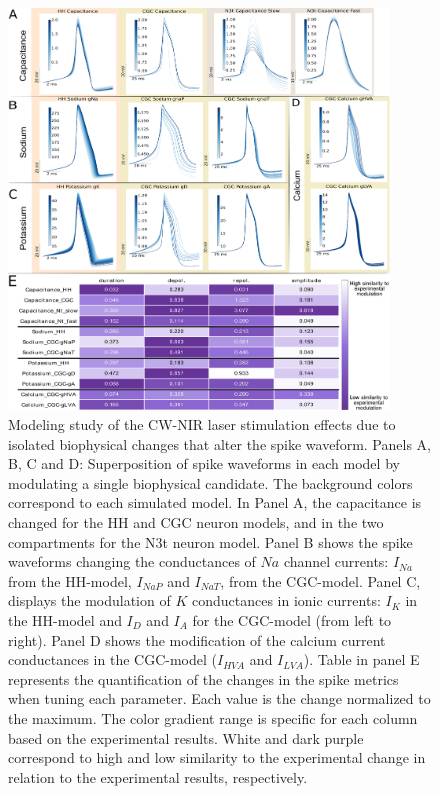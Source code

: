 \begin{figure}[hbt!]
     \centering
     \includegraphics[width=0.90\textwidth]{img/laser/continue_model_w_stats_table_purple.eps}
     
     \caption{Modeling study of the CW-NIR laser stimulation effects due to isolated biophysical changes that alter the spike waveform. Panels A, B, C and D: Superposition of spike waveforms in each model by modulating a single biophysical candidate. The background colors correspond to each simulated model. In Panel A, the capacitance is changed for the HH and CGC neuron models, and in the two compartments for the N3t neuron model. Panel B shows the spike waveforms changing the conductances of $Na$ channel currents: $I_{Na}$ from the HH-model, $I_{NaP}$ and $I_{NaT}$, from the CGC-model. Panel C, displays the modulation of $K$ conductances in ionic currents: $I_{K}$ in the HH-model and $I_{D}$ and $I_{A}$ for the CGC-model (from left to right). Panel D shows the modification of the calcium current conductances in the CGC-model ($I_{HVA}$ and $I_{LVA}$). Table in panel E represents the quantification of the changes in the spike metrics when tuning each parameter. Each value is the change normalized to the maximum. The color gradient range is specific for each column based on the experimental results. White and dark purple correspond to high and low similarity to the experimental change in relation to the experimental results, respectively.}
     \label{fig:continuous_model}
\end{figure}

